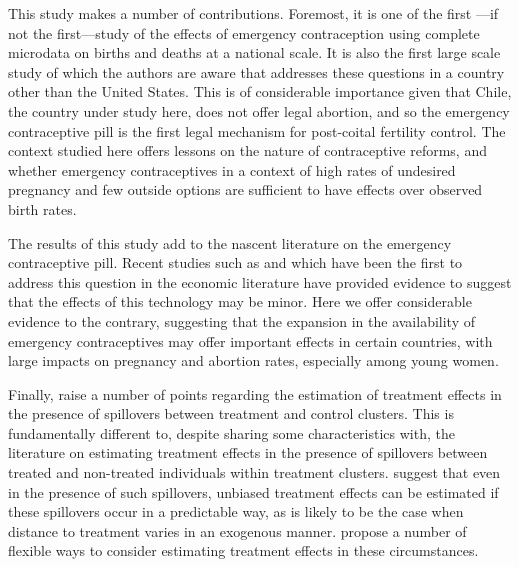 This study makes a number of contributions.  Foremost, it is one of the first%
---if not the first---study of the effects of emergency contraception using 
complete microdata on births and deaths at a national scale. It is also the first 
large scale study of which the authors are aware that addresses these questions 
in a country other than the United States.  This is of considerable importance 
given that Chile, the country under study here, does not offer legal abortion, 
and so the emergency contraceptive pill is the first legal mechanism for 
post-coital fertility control.  The context studied here offers lessons on the 
nature of contraceptive reforms, and whether emergency contraceptives in a 
context of high rates of undesired pregnancy and few outside options are 
sufficient to have effects over observed birth rates.

The results of this study add to the nascent literature on the emergency 
contraceptive pill.  Recent studies such as \citet{Grossetal2014} and 
\citet{Durrance2013} which have been the first to address this question in 
the economic literature have provided evidence to suggest that the effects of 
this technology may be minor.  Here we offer considerable evidence to the 
contrary, suggesting that the expansion in the availability of emergency 
contraceptives may offer important effects in certain countries, with large 
impacts on pregnancy and abortion rates, especially among young women.

Finally, \person raise a number of points regarding the estimation of 
treatment effects in the presence of spillovers between treatment and control
clusters.  This is fundamentally different to, despite sharing some 
characteristics with, the literature on estimating treatment effects in the 
presence of spillovers between treated and non-treated individuals within 
treatment clusters.  \Person suggest that even in the presence of such 
spillovers, unbiased treatment effects can be estimated if these spillovers
occur in a predictable way, as is likely to be the case when distance to 
treatment varies in an exogenous manner. \Person propose a number of flexible
ways to consider estimating treatment effects in these circumstances.

  
